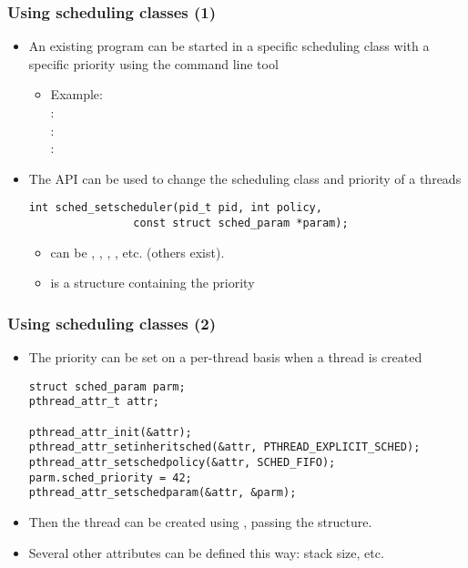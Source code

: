 \begin{frame}[fragile]
  \frametitle{Using scheduling classes (1)}
  \begin{itemize}
  \item An existing program can be started in a specific scheduling
    class with a specific priority using the  command line tool
    \begin{itemize}
    \item Example:  \\
        : \\
        : \\
        : 
    \end{itemize}
  \item The  API can be used to change the scheduling class
    and priority of a threads
    \begin{block}{}
\begin{verbatim}
int sched_setscheduler(pid_t pid, int policy,
                const struct sched_param *param);
\end{verbatim}
    \end{block}{}
    \begin{itemize}
    \item {} can be , ,
      , , etc. (others exist).
    \item {} is a structure containing the priority
    \end{itemize}
  \end{itemize}
\end{frame}

\begin{frame}[fragile]
  \frametitle{Using scheduling classes (2)}
  \begin{itemize}
  \item The priority can be set on a per-thread basis when a thread is
    created
    \begin{block}{}
\footnotesize
\begin{verbatim}
struct sched_param parm;
pthread_attr_t attr;

pthread_attr_init(&attr);
pthread_attr_setinheritsched(&attr, PTHREAD_EXPLICIT_SCHED);
pthread_attr_setschedpolicy(&attr, SCHED_FIFO);
parm.sched_priority = 42;
pthread_attr_setschedparam(&attr, &parm);
\end{verbatim}
\normalsize
    \end{block}
  \item Then the thread can be created using ,
    passing the  structure.
  \item Several other attributes can be defined this way: stack size,
    etc.
  \end{itemize}
\end{frame}


